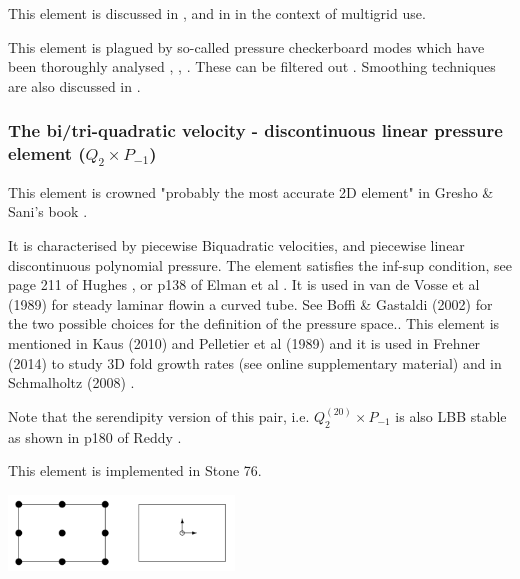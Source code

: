 This element is discussed in \cite{fort81}, \cite{fofo85} and in \cite{pisa85} 
in the context of multigrid use.

This element is plagued by so-called pressure checkerboard modes which
have been thoroughly analysed \cite{grsi94}, \cite{chpc95}, \cite{sagl81a,sagl81b}.
These can be filtered out \cite{chpc95}. Smoothing techniques are also discussed in \cite{legs79}.

\Literature \cite{fobo90}\cite{grle85}\cite{leru86}



\subsubsection{The bi/tri-quadratic velocity - discontinuous linear pressure element ($Q_2 \times P_{-1}$)}
\label{ss:pairq2pm1}

This element is crowned "probably the most accurate 2D element" in Gresho \& Sani's book \cite{grsa}.

It is characterised by piecewise Biquadratic velocities, 
and piecewise linear discontinuous polynomial pressure. 
The element satisfies the inf-sup condition, see page 211 of Hughes \cite{hugh}, or p138 of Elman et al
\cite{elsw}.
It is used in van de Vosse et al (1989) \cite{vavs89} for steady laminar flowin a curved tube. 
See Boffi \& Gastaldi (2002) \cite{boga02} 
for the two possible choices for the definition of the pressure space..
This element is mentioned in Kaus (2010) \cite{kaus10} and Pelletier et al (1989) \cite{pefc89} 
and it is  used in Frehner (2014) \cite{freh14} to study 3D fold growth rates 
(see online supplementary material) and in Schmalholtz (2008) \cite{schm08}.

Note that the serendipity version of this pair, i.e. $Q_2^{(20)}\times P_{-1}$ is also LBB stable
as shown in p180 of Reddy \cite{reddybook2}.

This element is implemented in Stone 76. 

\begin{center}
\includegraphics[width=6cm]{images/q2pm1/q2pm1}
\end{center}


